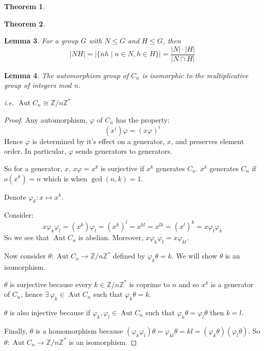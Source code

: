 \documentclass[a4paper, oneside, 12pt, final]{article}
\newtheorem{theorem}{Theorem}[section]
\newtheorem{lemma}[theorem]{Lemma}
\theoremstyle{definition}
\DeclareMathOperator{\Aut}{Aut}
\newcommand{\Z}{\mathbb{Z}}
\newcommand{\Zn}[1]{\Z/#1\Z}
\begin{document}
\begin{theorem}
\label{thm:iso2}
\end{theorem}

\begin{theorem}
\label{thm:iso3}
\end{theorem}

\begin{lemma}
\label{lem:setprodorder}
    For a group \(G\) with \(N \leqslant G\) and \(H \leqslant G\), then
    \[|NH| = |\{nh \mid n \in N, h \in H\}| = \frac{|N| \cdot |H|}{|N \cap H|}\]
\end{lemma}

\begin{lemma}
\label{lem:aut}
    The automorphism group of \(C_n\) is isomorphic to the multiplicative group
    of integers mod n.

    i.e. \(\Aut{C_n} \cong \Zn{n}^*\)
\end{lemma}

\begin{proof}
    Any automorphism, \(\varphi\) of \(C_n\) has the property:
    \[(x^i)\varphi = (x\varphi)^i\]
    Hence \(\varphi\) is determined by it's effect on a generator, \(x\), and
    preserves element order.
    In particular, \(\varphi\) sends generators to generators.

    So for a generator, \(x\), \(x\varphi = x^k\) is surjective if \(x^k\)
    generates \(C_n\).
    \(x^k\) generates \(C_n\) if \(o(x^k) = n\) which is when \(\gcd{(n, k)} =
    1\).

    Denote \(\varphi_k:x \mapsto x^k\).

    Consider:
    \[x\varphi_k\varphi_l = (x^k)\varphi_l = (x^k)^l = x^{kl} = x^{lk} =
    (x^l)^k = x\varphi_l\varphi_k\]
    So we see that \(\Aut{C_n}\) is abelian.
    Moreover, \(x\varphi_k\varphi_l = x\varphi_{kl}\).

    Now consider \(\theta:\Aut{C_n} \to \Zn{n}^*\) defined by \(\varphi_k\theta
    = k\).
    We will show \(\theta\) is an isomorphism.

    \(\theta\) is surjective because every \(k \in \Zn{n}^*\) is coprime to
    \(n\) and so \(x^k\) is a generator of \(C_n\), hence \(\exists\,\varphi_k
    \in \Aut{C_n}\) such that \(\varphi_k\theta = k\).

    \(\theta\) is also injective because if \(\varphi_k, \varphi_l \in
    \Aut{C_n}\) such that \(\varphi_k\theta = \varphi_l\theta\) then \(k = l\).

    Finally, \(\theta\) is a homomorphism because \((\varphi_k\varphi_l)\theta
    = \varphi_{kl}\theta = kl = (\varphi_k\theta)(\varphi_l\theta)\).
    So \(\theta:\Aut{C_n} \to \Zn{n}^*\) is an isomorphism.

\end{proof}
\end{document}
